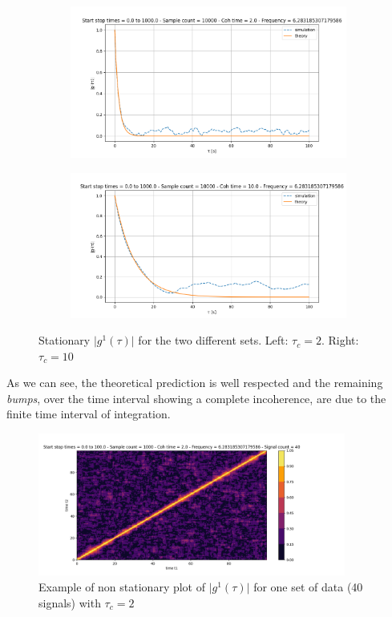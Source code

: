 \documentclass[10pt]{report}
\begin{document}
\begin{figure}[h!]
\centering
\begin{subfigure}{.48\textwidth}
  \centering
  \includegraphics[width=1.1\linewidth]{test_stat_2}
\end{subfigure}%
\hspace{1em}%
\begin{subfigure}{.48\textwidth}
  \centering
  \includegraphics[width=1.1\linewidth]{test_stat_10}
\end{subfigure}
\caption{Stationary $\vert g^1(\tau) \vert$ for the two different sets. Left: $\tau_c=2$. Right: $\tau_c=10$}
\end{figure}

As we can see, the theoretical prediction is well respected and the remaining \textit{bumps}, over the time interval showing a complete incoherence, are due to the finite time interval of integration.

\begin{figure}[h!]
\caption{Example of non stationary plot of $\vert g^1(\tau) \vert$ for one set of data (40 signals) with $\tau_c=2$}
\centering
\includegraphics[width=0.9\textwidth]{test_g12}
\end{figure}
\end{document}
